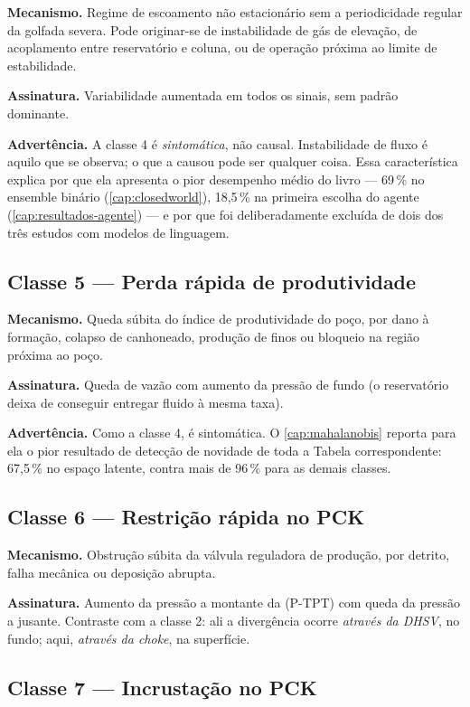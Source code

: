 \textbf{Mecanismo.} Regime de escoamento não estacionário sem a periodicidade regular
da golfada severa. Pode originar-se de instabilidade de gás de elevação, de
acoplamento entre reservatório e coluna, ou de operação próxima ao limite de
estabilidade.

\textbf{Assinatura.} Variabilidade aumentada em todos os sinais, sem padrão dominante.

\textbf{Advertência.} A classe 4 é \emph{sintomática}, não causal. Instabilidade de
fluxo é aquilo que se observa; o que a causou pode ser qualquer coisa. Essa
característica explica por que ela apresenta o pior desempenho médio do livro --- 69\,\%
no ensemble binário (\cref{cap:closedworld}), 18,5\,\% na primeira escolha do agente
(\cref{cap:resultados-agente}) --- e por que foi deliberadamente excluída de dois dos
três estudos com modelos de linguagem.

\subsection{Classe 5 --- Perda rápida de produtividade}

\textbf{Mecanismo.} Queda súbita do índice de produtividade do poço, por dano à
formação, colapso de canhoneado, produção de finos ou bloqueio na região próxima ao
poço.

\textbf{Assinatura.} Queda de vazão com aumento da pressão de fundo (o reservatório
deixa de conseguir entregar fluido à mesma taxa).

\textbf{Advertência.} Como a classe 4, é sintomática. O \cref{cap:mahalanobis} reporta
para ela o pior resultado de detecção de novidade de toda a Tabela correspondente:
67,5\,\% no espaço latente, contra mais de 96\,\% para as demais classes.

\subsection{Classe 6 --- Restrição rápida no PCK}

\textbf{Mecanismo.} Obstrução súbita da válvula reguladora de produção, por detrito,
falha mecânica ou deposição abrupta.

\textbf{Assinatura.} Aumento da pressão a montante da  (P-TPT) com queda da
pressão a jusante. Contraste com a classe 2: ali a divergência ocorre \emph{através da
DHSV}, no fundo; aqui, \emph{através da choke}, na superfície.

\subsection{Classe 7 --- Incrustação no PCK}

